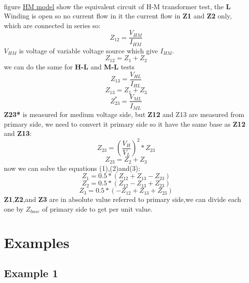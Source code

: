 \documentclass[]{article}
\begin{document}
\paragraph{}figure \hyperref[fig:HMTestM]{HM model} show the equivalent circuit of H-M transformer test, the \textbf{L} Winding is open so no current flow in it the current flow in \textbf{Z1} and \textbf{Z2} only, which are connected in series so:
\begin{equation*}
	Z_{12}=\frac{V_{HM}}{I_{HM}}
\end{equation*}
$V_{HM}$ is voltage of variable voltage source which give $I_{HM}$.
\begin{equation}Z_{12}=Z_1+Z_2\end{equation}
we can do the same for \textbf{H-L} and \textbf{M-L} tests
\begin{equation*}Z_{13}=\frac{V_{HL}}{I_{HL}}
\end{equation*}
\begin{equation}Z_{13}=Z_1+Z_3 \end{equation}
\begin{equation*}Z_{23}^*=\frac{V_{ML}}{I_{ML}}
\end{equation*}
\textbf{Z23*} is measured for medium voltage side, but \textbf{Z12} and Z13 are measured from primary side, we need to convert it primary side so it have the same base as \textbf{Z12} and \textbf{Z13}:
\begin{equation*}Z_{23}=\left(\frac{V_H}{V_L}\right)^2*Z_{23} \end{equation*}
\begin{equation}Z_{23}=Z_2+Z_3 \end{equation}
now we can solve the equations (1),(2)and(3):
\begin{equation}Z_1=0.5*(Z_{12}+Z_{13}-Z_{23})\end{equation}
\begin{equation}Z_2=0.5*(Z_{12}-Z_{13}+Z_{23})\end{equation}
\begin{equation}Z_3=0.5*(-Z_{12}+Z_{13}+Z_{23})\end{equation}
\textbf{Z1},\textbf{Z2},and \textbf{Z3} are in absolute value referred to primary side,we can divide each one by $Z_{base}$ of primary side to get per unit value. 
\section{Examples} 
\subsection{Example 1}
\end{document}
